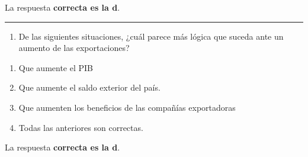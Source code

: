 \documentclass[
  letterpaper,
  DIV=11,
  numbers=noendperiod]{scrreprt}
\providecommand{\tightlist}{%
  \setlength{\itemsep}{0pt}\setlength{\parskip}{0pt}}\usepackage{longtable,booktabs,array}
\begin{document}
\begin{tcolorbox}[enhanced jigsaw, left=2mm, opacityback=0, colback=white, breakable, arc=.35mm, bottomrule=.15mm, rightrule=.15mm, toprule=.15mm, leftrule=.75mm, colframe=quarto-callout-tip-color-frame]
\begin{minipage}[t]{5.5mm}
\textcolor{quarto-callout-tip-color}{\faLightbulb}
\end{minipage}%
\begin{minipage}[t]{\textwidth - 5.5mm}

La respuesta \textbf{correcta es la d}.

\end{minipage}%
\end{tcolorbox}

\begin{center}\rule{0.5\linewidth}{0.5pt}\end{center}

\begin{enumerate}
\def\labelenumi{\arabic{enumi}.}
\setcounter{enumi}{60}
\tightlist
\item
  De las siguientes situaciones, ¿cuál parece más lógica que suceda ante
  un aumento de las exportaciones?
\end{enumerate}

\begin{enumerate}
\def\labelenumi{\alph{enumi}.}
\item
  Que aumente el PIB
\item
  Que aumente el saldo exterior del país.
\item
  Que aumenten los beneficios de las compañías exportadoras
\item
  Todas las anteriores son correctas.
\end{enumerate}

\begin{tcolorbox}[enhanced jigsaw, left=2mm, opacityback=0, colback=white, breakable, arc=.35mm, bottomrule=.15mm, rightrule=.15mm, toprule=.15mm, leftrule=.75mm, colframe=quarto-callout-tip-color-frame]
\begin{minipage}[t]{5.5mm}
\textcolor{quarto-callout-tip-color}{\faLightbulb}
\end{minipage}%
\begin{minipage}[t]{\textwidth - 5.5mm}

La respuesta \textbf{correcta es la d}.

\end{minipage}%
\end{tcolorbox}
\end{document}
